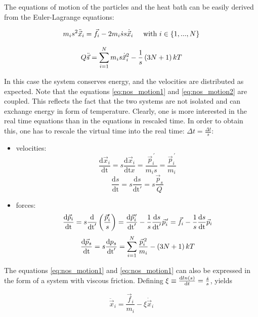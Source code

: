The  equations of motion of the particles and the heat bath can be easily derived from the Euler-Lagrange equations:

\begin{equation}
m_is^2 \ddot{\vec{x}}_i = \vec{f}_i - 2 m_i \dot{s} s \dot{\vec{x}}_i \hspace{.5cm} \text{with } i\in\left\{1,...,N\right\}
\label{eq:nos_motion1}
\end{equation}

\begin{equation}
Q \ddot{\vec{s}} = \sum^N_{i=1}{ m_is\dot{\vec{x}}_i^2 }  -  \frac{1}{s}\left(3N+1\right)kT   
\label{eq:nos_motion2}
\end{equation}

In this case the system conserves energy, and the velocities are distributed as expected. Note that the equations \eqref{eq:nos_motion1} and \eqref{eq:nos_motion2} are coupled. This reflects the fact that the two systems are not isolated and can exchange energy in form of temperature. Clearly, one is more interested in the real time equations than in the equations in rescaled time. In order to obtain this, one has to rescale the virtual time into the real time: $\Delta t = \frac{\Delta t}{s}$:

\begin{itemize}
\item velocities:  $$\frac{\text{d}\vec{x}_i}{\text{dt}} = s \frac{\text{d}\vec{x}_i}{\text{dt}x} =\frac{\vec{p}_i^{\,\prime}}{m_is} = \frac{\vec{p}_i^{\,\prime}}{m_i}  $$  $$\frac{\text{d}s}{\text{dt}} = s \frac{\text{d}s}{\text{dt}'} =s \frac{\vec{p}_s}{Q}  $$
\item forces:  $$\frac{\text{d}\vec{p}_i}{\text{dt}} =s \frac{\text{d}}{\text{dt}'}\left(\frac{\vec{p}_i'}{s}\right) = \frac{\text{d}\vec{p}_i^{\,\prime}}{\text{dt}'} - \frac{1}{s} \frac{\text{d}s}{\text{dt}'}\vec{p}_i^{\,\prime}   =  \vec{f}_i -  \frac{1}{s} \frac{\text{d}s}{\text{dt}}\vec{p}_i$$   $$\frac{\text{d}\vec{p}_s}{\text{dt}} =s \frac{\text{d}p_s}{\text{dt}'} =\sum^N_{i=1}{\frac{\vec{p}_i^{\,2}}{m_i}} - \left(3N+1\right)kT $$
\end{itemize}

The equations \eqref{eq:nos_motion1} and \eqref{eq:nos_motion1} can also be expressed in the form of a system with viscous friction. Defining $\xi\equiv \frac{\text{d} ln\left(s\right)}{\text{d} t} = \frac{\dot{s}}{s}$, yields


\begin{equation}
\ddot{\vec{x}}_i =\frac{ \vec{f}_i }{m_i} - \xi \dot{\vec{x}}_i
\label{eq:nos_motion3}
\end{equation}

